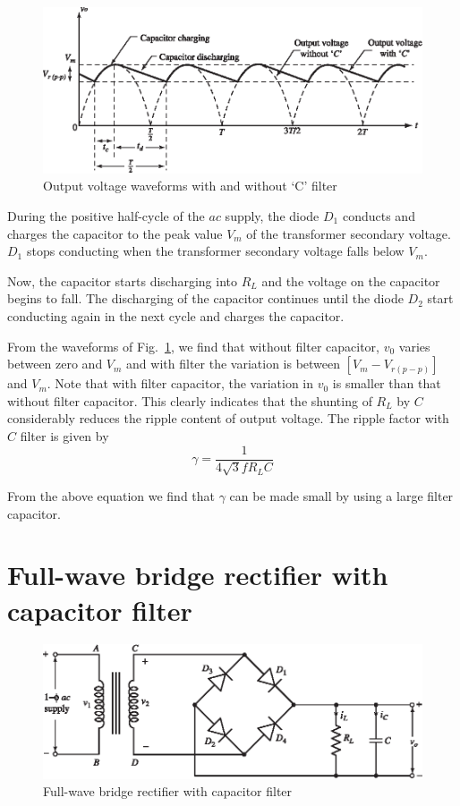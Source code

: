 \begin{figure}[H]
\centering
\includegraphics{chap2/add-fig/S3-EE-02-016.eps}
\caption{Output voltage waveforms with and without `C' filter}\label{fig2.16}
\end{figure}

During the positive half-cycle of the $ac$ supply, the diode $D_1$
conducts and charges the capacitor to the peak value $V_m$ of the
transformer secondary voltage. $D_1$ stops conducting when the
transformer secondary voltage falls below $V_m$.

Now, the capacitor starts discharging into $R_L$ and the voltage on
the capacitor begins to fall. The discharging of the capacitor
continues until the diode $D_2$ start conducting again in the next
cycle and charges the capacitor.

\eject

From the waveforms of Fig.~\ref{fig2.16}, we find that without filter
capacitor, $v_0$ varies between zero and $V_m$ and with filter the
variation is between $[V_m-V_{r(p-p)}]$ and $V_m$. Note that with
filter capacitor, the variation in $v_0$ is smaller than that without
filter capacitor. This clearly indicates that the shunting of $R_L$ by
$C$ considerably reduces the ripple content of output voltage. The
ripple factor with $C$ filter is given by
\begin{equation}
\gamma = \frac{1}{4 \sqrt{3} f R_L C}  \label{eq2.55}
\end{equation}

From the above equation we find that $\gamma$ can be made small by
using a large filter capacitor.

\section{Full-wave bridge rectifier with capacitor
  filter}\label{sec2.22}
\begin{figure}[H]
\centering
\includegraphics[scale=.95]{chap2/add-fig/S3-EE-02-017.eps}
\caption{Full-wave bridge rectifier with capacitor filter}\label{fig2.17}
\end{figure}

